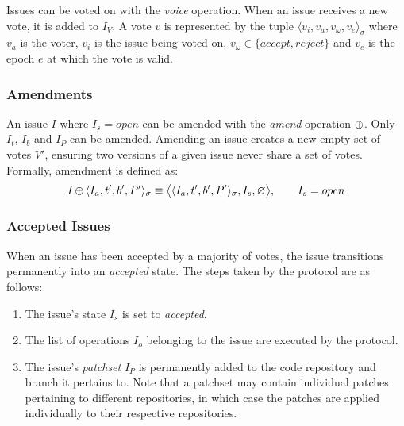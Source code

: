 Issues can be voted on with the \emph{voice} operation. When an issue receives
a new vote, it is added to $I_V$. A vote $v$ is represented by the tuple
$\langle v_i, v_a, v_{\omega}, v_e \rangle_{\sigma}$ where $v_a$ is the voter,
$v_i$ is the issue being voted on, $v_{\omega} \in \{accept, reject\}$ and
$v_e$ is the epoch $e$ at which the vote is valid.

\subsubsection{Amendments}

An issue $I$ where $I_s = open$ can be amended with the \emph{amend} operation
$\operatorname{\oplus}$. Only $I_t$, $I_b$ and $I_P$ can be amended.  Amending an issue creates
a new empty set of votes $V'$, ensuring two versions of a given issue never
share a set of votes. Formally, amendment is defined as:
\begin{align*}
    I \operatorname{\oplus}{} \langle I_a, t', b', P' \rangle_{\sigma} \equiv \big<\langle
    I_a, t', b', P' \rangle_{\sigma}, I_s, \varnothing \big>, \qquad I_s = open
\end{align*}

\subsubsection{Accepted Issues} When an issue has been accepted by a majority
of votes, the issue transitions permanently into an \emph{accepted} state. The
steps taken by the protocol are as follows:

\begin{enumerate}
    \item The issue's state $I_s$ is set to \emph{accepted}.
    \item The list of operations $I_o$ belonging to the issue are executed by
        the protocol.
    \item The issue's \emph{patchset} $I_P$ is permanently added to the code
        repository and branch it pertains to. Note that a patchset may contain
        individual patches pertaining to different repositories, in which case
        the patches are applied individually to their respective repositories.
\end{enumerate}

